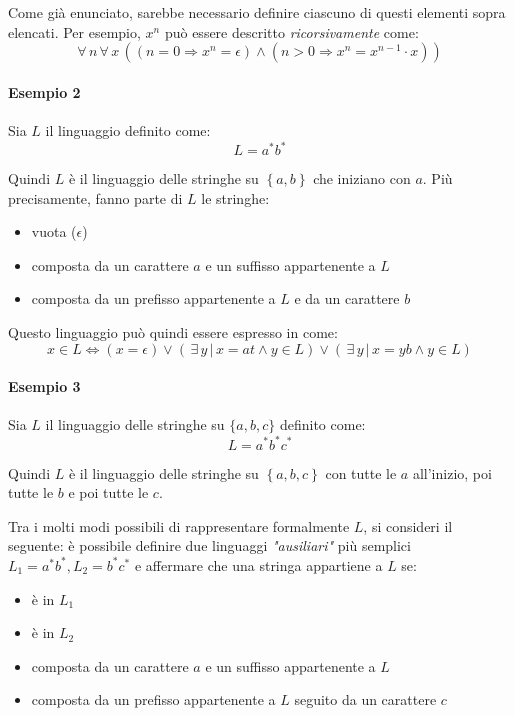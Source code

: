 \documentclass[italian, 10pt]{article}
\begin{document}
Come già enunciato, sarebbe necessario definire ciascuno di questi elementi sopra elencati.
Per esempio, \(x^n\) può essere descritto \textit{ricorsivamente} come:
\[ \forall \, n \, \forall \, x\,  ((n = 0 \Rightarrow x^n = \epsilon) \land (n > 0 \Rightarrow x^n = x^{n-1} \cdot x)) \]

\paragraph{Esempio 2}
\label{par:esempio-fol-2}

Sia \(L\) il linguaggio definito come:
\[ L = a^\ast b^\ast \]

Quindi \(L\) è il linguaggio delle stringhe su \(\left\{ a, b \right\}\) che iniziano con \(a\).
Più precisamente, fanno parte di \(L\) le stringhe:

\begin{itemize}
  \item vuota (\(\epsilon\))
  \item composta da un carattere \(a\) e un suffisso appartenente a \(L\)
  \item composta da un prefisso appartenente a \(L\) e da un carattere \(b\)
\end{itemize}

Questo linguaggio può quindi essere espresso in \FOL come:
\[ x \in L \Leftrightarrow (x = \epsilon) \lor \left( \, \exists \, y \, | \, x = at \land y \in L \right) \lor \left( \, \exists \, y \, | \, x = yb \land y \in L \right) \]

\paragraph{Esempio 3}
\label{par:esempio-fol-3}

Sia \(L\) il linguaggio delle stringhe su \(\{a, b, c\}\) definito come:
\[ L = a^\ast b^\ast c^\ast \]

Quindi \(L\) è il linguaggio delle stringhe su \(\left\{ a, b, c \right\}\) con tutte le \(a\) all'inizio, poi tutte le \(b\) e poi tutte le \(c\).

Tra i molti modi possibili di rappresentare formalmente \(L\), si consideri il seguente: è possibile definire due linguaggi \textit{"ausiliari"} più semplici \(L_1 = a^\ast b^\ast, L_2 = b^\ast c^\ast\) e affermare che una stringa appartiene a \(L\) se:

\begin{itemize}
  \item è in \(L_1\)
  \item è in \(L_2\)
  \item composta da un carattere \(a\) e un suffisso appartenente a \(L\)
  \item composta da un prefisso appartenente a \(L\) seguito da un carattere \(c\)
\end{itemize}
\end{document}
